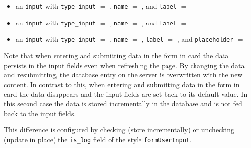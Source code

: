 \documentclass[a4paper,oneside]{book}
\begin{document}
\begin{itemize}
\begin{itemize}
\begin{itemize}
\begin{itemize}
                            \item an \texttt{input} with \texttt{type\_input} $=$ , \texttt{name} $=$ , and \texttt{label} $=$ 
                            \item an \texttt{input} with \texttt{type\_input} $=$ , \texttt{name} $=$ , and \texttt{label} $=$ 
                            \item an \texttt{input} with \texttt{type\_input} $=$ , \texttt{name} $=$ , \texttt{label} $=$ , and \texttt{placeholder} $=$ 
                        \end{itemize}
                \end{itemize}
        \end{itemize}
\end{itemize}

Note that when entering and submitting data in the form in card  the data persists in the input fields even when refreshing the page.
By changing the data and resubmitting, the database entry on the server is overwritten with the new content.
In contrast to this, when entering and submitting data in the form in card  the data disappears and the input fields are set back to its default value.
In this second case the data is stored incrementally in the database and is not fed back to the input fields.

This difference is configured by checking (store incrementally) or unchecking (update in place) the \texttt{is\_log} field of the style \texttt{formUserInput}.
\end{document}
